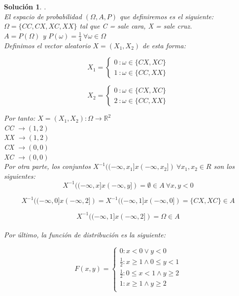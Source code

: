 \documentclass[11pt, a4paper]{article}
\newif\IfInSansMode
\newcommand{\R}{\mathbb{R}} \newcommand{\N}{\mathbb{N}}
\theoremstyle{theorem-style}
\theoremstyle{definition-style}
\theoremstyle{remark-style}
\newtheorem*{sol}{Solución}
\theoremstyle{example-style}
\begin{document}
\begin{sol}.
\\ El espacio de probabilidad $(\Omega,A,P)$ que definiremos es el siguiente: \\
$\Omega = \{CC,CX,XC,XX\}$ tal que C = sale cara, X = sale cruz.\\
$A = P(\Omega)$ y $P(\omega) = \frac{1}{4} \ \forall \omega \in \Omega$ \\

Definimos el vector aleatorio $X=(X_1,X_2)$ de esta forma:

\begin{equation}
X_1 = \left\lbrace
\begin{array}{ll}
0 \ : \omega \in \{CX,XC\} \\
1 \ : \omega \in \{CC,XX\}
\end{array}
\right.
\end{equation}

\begin{equation}
X_2 = \left\lbrace
\begin{array}{ll}
0 \ : \omega \in \{CX,XC\} \\
2 \ : \omega \in \{CC,XX\}
\end{array}
\right.
\end{equation}

Por tanto: $X = (X_1,X_2): \Omega \to \R^2$ \\
CC $ \to (1,2)$ \\
XX $ \to (1,2)$ \\
CX $ \to (0,0)$ \\
XC $ \to (0,0)$ \\

Por otra parte, los conjuntos $X^{-1}((-\infty,x_1]x(-\infty,x_2]) \ \forall x_1,x_2 \in R$ son los siguientes: \\
$$X^{-1}((-\infty,x]x(-\infty,y]) = \emptyset \in A \ \forall x,y < 0$$

$$X^{-1}((-\infty,0]x(-\infty,2]) = X^{-1}((-\infty,1]x(-\infty,0]) = \{CX,XC\} \in A $$

$$X^{-1}((-\infty,1]x(-\infty,2]) = \Omega \in A $$ \\

Por último, la función de distribución es la siguiente:

\begin{equation}
F(x,y) = \left\lbrace
\begin{array}{ll}
0 : x < 0 \lor y < 0\\
\frac{1}{2} : x \ge 1 \land 0 \le y < 1\\
\frac{1}{2} : 0 \le x < 1 \land y \ge 2 \\
1 : x \ge 1 \land y \ge 2 \\
\end{array}
\right.
\end{equation}

\end{sol}
\end{document}

